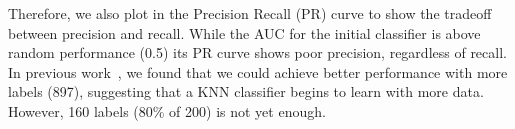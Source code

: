 Therefore, we also plot in the Precision Recall (PR) curve to show the tradeoff between precision and recall.
While the AUC for the initial classifier is above random performance (0.5) 
its PR curve shows poor precision, regardless of recall.
In previous work~\cite{tchoua2019polyner}, we found that we could 
achieve better performance with more labels (897), suggesting that a KNN classifier begins to learn with more data. 
However, 160 labels (80\% of 200) is not yet enough. %


